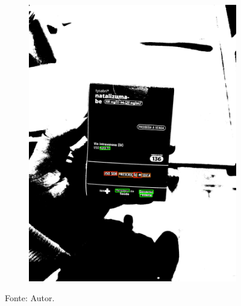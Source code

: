 \begin{figure}[htb]
\begin{subfigure}[t]{0.21\textwidth}
        \includegraphics[width=\linewidth]{../pictures/tysabri_rgb_b_only_thresh_boxes.jpg}
    \end{subfigure}
    \caption*{Fonte: Autor.}
    \label{fig:foto:versoes:1}
\end{figure}


